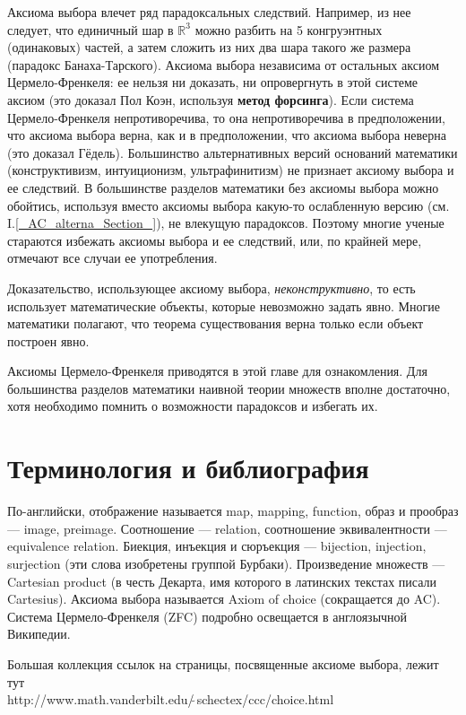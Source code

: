 \documentclass[12pt]{book}
\def\R{{\mathbb R}}
\theoremstyle{upshape}
\theoremstyle{generic}
\def\еза{\end{remark}}
\theoremstyle{upshapenonumber}
\newcommand{\следствие}{%
     \refstepcounter{teorema}
     {\noindent\bf Следствие \thechapter.\arabic{teorema}:\ }}
\newcommand{\пример}{%
     \refstepcounter{teorema}
     {\noindent\bf Пример \thechapter.\arabic{teorema}:\ }}
\newcommand{\лемма}{%
     \refstepcounter{teorema}
     {\noindent\bf Лемма \thechapter.\arabic{teorema}:\ }}
\newcommand{\теорема}{%
     \refstepcounter{teorema}
     {\noindent\bf Теорема \thechapter.\arabic{teorema}:\ }}
\newcommand{\утверждение}{%
     \refstepcounter{teorema}
     {\noindent\bf Утверждение \thechapter.\arabic{teorema}:\ }}
\def\бф{\bf}
\def\ем{\em}
\def\ез{\end{zadacha}}
\def\еу{\end{ukazanie}}
\def\ео{\end{opredelenie}}
\def\енум{\begin{enumerate}}
\def\ее{\end{enumerate}}
\begin{document}
Аксиома выбора влечет ряд парадоксальных следствий.
Например, из нее следует, что единичный шар в $\R^3$
можно разбить на 5 конгруэнтных (одинаковых) 
частей, а затем сложить
из них два шара такого же размера
(парадокс Банаха-Тарского). Аксиома выбора
независима от остальных аксиом Цермело-Френкеля:
ее нельзя ни доказать, ни опровергнуть
в этой системе аксиом (это доказал Пол Коэн,
используя {\бф метод форсинга}).
Если система Цермело-Френкеля
непротиворечива, то она непротиворечива
в предположении, что аксиома выбора верна,
как и в предположении, что аксиома выбора неверна
(это доказал Гёдель).
Большинство альтернативных версий оснований математики
(конструктивизм, интуиционизм, ультрафинитизм) не
признает аксиому выбора и ее следствий. В большинстве
разделов математики без аксиомы выбора можно обойтись,
используя вместо аксиомы выбора какую-то ослабленную 
версию (см. I.\ref{_AC_alterna_Section_}), не влекущую парадоксов.
Поэтому многие ученые стараются избежать
аксиомы выбора и ее следствий, или, по крайней мере,
отмечают все случаи ее употребления. 

Доказательство, использующее аксиому выбора,
{\ем неконструктивно}, то есть использует 
математические объекты, которые невозможно
задать явно. Многие математики полагают,
что теорема существования верна только
если объект построен явно.

Аксиомы Цермело-Френкеля приводятся 
в этой главе для ознакомления.
Для большинства разделов математики наивной теории множеств
вполне достаточно, хотя необходимо помнить 
о возможности парадоксов и избегать их. 


\section{Терминология и библиография}


По-английски, отображение называется map, mapping, function,
образ и прообраз --- image, preimage.
Соотношение --- relation, соотношение эквивалентности --- 
equivalence relation. Биекция, инъекция и сюръекция --- bijection,
injection, surjection (эти слова изобретены группой Бурбаки).
Произведение множеств --- Cartesian product (в честь Декарта,
имя которого в латинских текстах писали Cartesius).
Аксиома выбора называется Axiom of choice (сокращается до AC). 
Система Цермело-Френкеля (ZFC) подробно освещается
в англоязычной Википедии. 

Большая коллекция
ссылок на страницы, посвященные аксиоме выбора, лежит тут\\
http://www.math.vanderbilt.edu/$\tilde\ $schectex/ccc/choice.html\\
\end{document}
